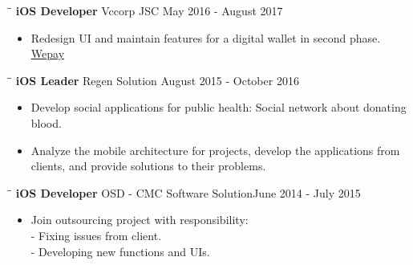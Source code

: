 \documentclass[margin, 10pt]{res}
\begin{document}
\begin{resume}
   \begin{tabbing}
   \hspace{2.0in}\= \hspace{2.0in}\= \kill %
   {\bf iOS Developer} \>Vccorp JSC \>May 2016 - August 2017\\
   \end{tabbing}\vspace{-20pt} %

   \begin{itemize}
      \item Redesign UI and maintain features for a digital wallet in second phase. 
      {\color{blue}\href{https://itunes.apple.com/au/app/vi-wepay/id1116328276?mt=8}{Wepay}}    \end{itemize}
   
   \begin{tabbing}
   \hspace{2.0in}\= \hspace{2.0in}\= \kill %
   {\bf iOS Leader} \>Regen Solution \>August 2015 - October 2016\\
   \end{tabbing}\vspace{-20pt} %

   \begin{itemize}
   	\item Develop social applications for public health: Social network about donating blood.
		\item Analyze the mobile architecture for projects, develop the applications 
      from clients, and provide solutions to their problems.
   \end{itemize}

   \begin{tabbing}
   \hspace{2.0in}\= \hspace{2.0in}\= \kill %
   {\bf iOS Developer} \>OSD - CMC  Software Solution\>June 2014 - July 2015\\
   \end{tabbing}\vspace{-20pt} %

   \begin{itemize}
   		\item Join outsourcing project with responsibility: \\ - Fixing issues from client. \\ - Developing new functions and UIs. 
		

\end{itemize}
\end{resume}
\end{document}
